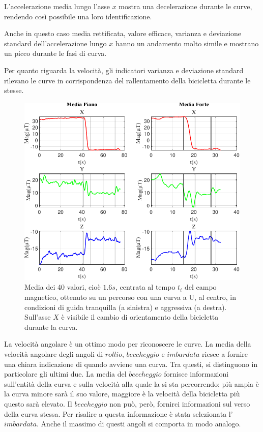 \documentclass[class=article]{standalone}
\begin{document}
	
	L'accelerazione media lungo l'asse \(x\) mostra una decelerazione durante le curve, rendendo così possibile una loro identificazione.
	
	Anche in questo caso media rettificata, valore efficace, varianza e deviazione standard dell'accelerazione lungo \(x\) hanno un andamento molto simile e mostrano un picco durante le fasi di curva.\hfill\break
	
	Per quanto riguarda la velocità, gli indicatori varianza e deviazione standard rilevano le curve in corrispondenza del rallentamento della bicicletta durante le stesse.\hfill\break
	
	\begin{center}
		\begin{figure}[h!]
			\centering\includegraphics[width=.7\textwidth]{img/CurvaUFP/Mag/Media}
			\caption[]{Media dei 40 valori, cioè \(1.6s\), centrata al tempo \(t_{i}\) del campo magnetico, ottenuto su un percorso con una curva a U, al centro, in condizioni di guida tranquilla (a sinistra) e aggressiva (a destra). Sull'asse \(X\) è visibile il cambio di orientamento della bicicletta durante la curva.}
			\label{fig:MagMedia_CurvaUFP}
		\end{figure}
	\end{center}
	
	La velocità angolare è un ottimo modo per riconoscere le curve. La media della velocità angolare degli angoli di \(rollio\), \(beccheggio\) e \(imbardata\) riesce a fornire una chiara indicazione di quando avviene una curva. Tra questi, si distinguono in particolare gli ultimi due. La media del \(beccheggio\) fornisce informazioni sull'entità della curva e sulla velocità alla quale la si sta percorrendo: più ampia è la curva minore sarà il suo valore, maggiore è la velocità della bicicletta più questo sarà elevato. Il \(beccheggio\) non può, però, fornirci informazioni sul verso della curva stessa. Per risalire a questa informazione è stata selezionata l'\(imbardata\). Anche il massimo di questi angoli si comporta in modo analogo.
	
\end{document}

